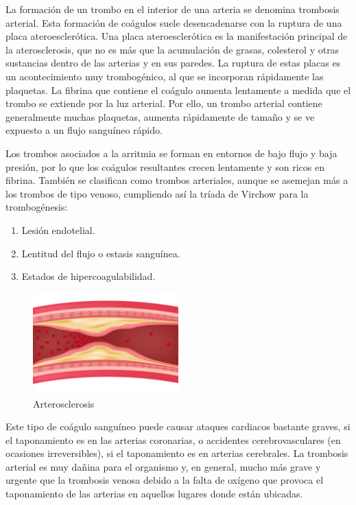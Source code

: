
La formación de un trombo en el interior de una arteria se denomina trombosis arterial. Esta formación de coágulos suele desencadenarse con la ruptura de una placa ateroesclerótica. Una placa ateroesclerótica es la manifestación principal de la aterosclerosis, que no es más que la acumulación de grasas, colesterol y otras sustancias dentro de las arterias y en sus paredes. La ruptura de estas placas es un acontecimiento muy trombogénico, al que se incorporan rápidamente las plaquetas.
La fibrina que contiene el coágulo aumenta lentamente a medida que el trombo se extiende por la luz arterial. Por ello, un trombo arterial contiene generalmente muchas plaquetas, aumenta rápidamente de tamaño y se ve expuesto a un flujo sanguíneo rápido.

Los trombos asociados a la arritmia se forman en entornos de bajo flujo y baja presión, por lo que los coágulos resultantes crecen lentamente y son ricos en fibrina. También se clasifican como trombos arteriales, aunque se asemejan más a los trombos de tipo venoso, cumpliendo así la tríada de Virchow para la trombogénesis:
        \begin{enumerate}
          \item Lesión endotelial.
          \item Lentitud del flujo o estasis sanguínea.
          \item Estados de hipercoagulabilidad.
         \end{enumerate}
\begin{figure}
    \centering
	\includegraphics[width=0.50\textwidth]{figures/aterosclerosis.png}
	\caption{Arterosclerosis}
	\label{fig:example1}
  \end{figure}

\newpage Este tipo de coágulo sanguíneo puede causar ataques cardiacos bastante graves, si el taponamiento es en las arterias coronarias, o accidentes cerebrovasculares (en ocasiones irreversibles), si el taponamiento es en arterias cerebrales. La trombosis arterial es muy dañina para el organismo y, en general, mucho más grave y urgente que la trombosis venosa debido a la falta de oxígeno que provoca el taponamiento de las arterias en aquellos lugares donde están ubicadas. 
	
